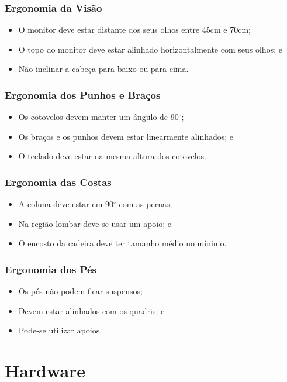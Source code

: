 \documentclass[aspectratio=169]{beamer} %
\begin{document}
\begin{frame}
	\frametitle{Ergonomia da Visão}
	
	\begin{itemize}
		\item O monitor deve estar distante dos seus olhos entre 45cm e 70cm;
		\item O topo do monitor deve estar alinhado horizontalmente com seus olhos; e
		\item Não inclinar a cabeça para baixo ou para cima.
	\end{itemize}
\end{frame}

\begin{frame}
	\frametitle{Ergonomia dos Punhos e Braços}
	
	\begin{itemize}
		\item Os cotovelos devem manter um ângulo de 90$^{\circ}$;
		\item Os braços e os punhos devem estar linearmente alinhados; e
		\item O teclado deve estar na mesma altura dos cotovelos.
	\end{itemize}
\end{frame}

\begin{frame}
	\frametitle{Ergonomia das Costas}
	
	\begin{itemize}
		\item A coluna deve estar em 90$^{\circ}$ com as pernas;
		\item Na região lombar deve-se usar um apoio; e
		\item O encosto da cadeira deve ter tamanho médio no mínimo.
	\end{itemize}
\end{frame}

\begin{frame}
	\frametitle{Ergonomia dos Pés}
	
	\begin{itemize}
		\item Os pés não podem ficar suspensos;
		\item Devem estar alinhados com os quadris; e
		\item Pode-se utilizar apoios. 
	\end{itemize}
\end{frame}

\section{Hardware}
\end{document}
